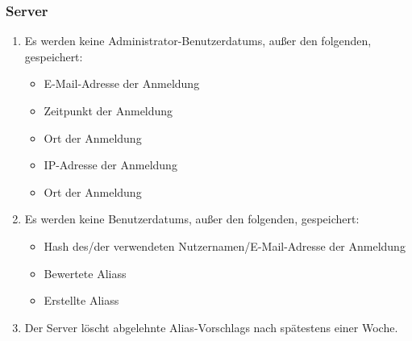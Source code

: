 \subsubsection*{Server}

\begin{samepage}
    \begin{enumerate}[label=\textbf{/NFD\arabic*0/}, align=left, resume]
        \item Es werden keine \Gls{Administrator}-\Glspl{Benutzerdatum}, außer den folgenden, gespeichert:
            \begin{itemize}
                \item E-Mail-Adresse der Anmeldung
                \item Zeitpunkt der Anmeldung
                \item Ort der Anmeldung
                \item \Gls{IP-Adresse} der Anmeldung
                \item Ort der Anmeldung
            \end{itemize}
        \item Es werden keine \Glspl{Benutzerdatum}, außer den folgenden, gespeichert:
            \begin{itemize}
                \item \Gls{Hash} des/der verwendeten Nutzernamen/E-Mail-Adresse der Anmeldung
                \item Bewertete \Glspl{Alias} 
                \item Erstellte \Glspl{Alias} 
            \end{itemize}
        \item Der \Gls{Server} löscht abgelehnte \Glspl{Alias-Vorschlag} nach spätestens einer Woche.
    \end{enumerate}
\end{samepage}
